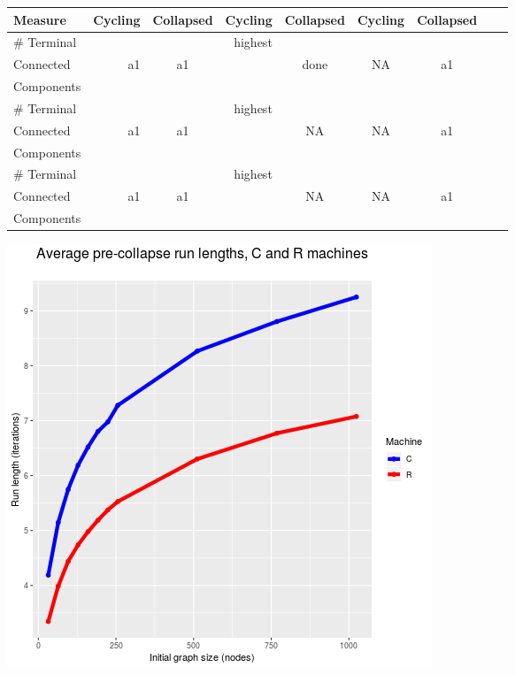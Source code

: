 \documentclass{tufte-handout}
\newcommand{\done}{\cellcolor{teal}done}  %
\begin{document}
\begin{table}
\centering
\begin{tabular}{lrcrccccc}
\toprule
Measure & Cycling & Collapsed & Cycling & Collapsed & Cycling & Collapsed \\
\midrule
\# Terminal &  &  & highest &  &  & \\
Connected & a1 & a1 & & \done & NA & a1  \\
Components &  &  &  &  &  & \\
\cmidrule(r){2-7}
\# Terminal &  &  & highest &  &  & \\
Connected & a1 & a1 & & NA & NA & a1  \\
Components &  &  &  &  &  & \\
\cmidrule(r){2-7}
\# Terminal &  &  & highest &  &  & \\
Connected & a1 & a1 & & NA & NA & a1  \\
Components &  &  &  &  &  & \\
\bottomrule
\end{tabular}
\label{tab:TabQ}
\end{table}
\hspace{8mm}\caption{Table \ref{tab:TabQ}: Comparison of Graph Measures --- Machines and Outcomes}
\vspace{3mm}

\clearpage

\begin{marginfigure}
  \includegraphics{figA.png}
  \caption{On average, the rule-based \textbf{C} machine executes more iterations than \textbf{R} before collapse occurs.}
  \label{fig:figA}
\end{marginfigure}
\end{document}
